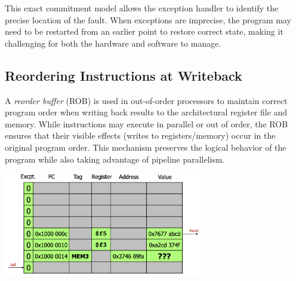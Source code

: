 This exact commitment model allows the exception handler to identify the precise location of the fault. When exceptions are imprecise, the program may need to be restarted from an earlier point to restore correct state, making it challenging for both the hardware and software to manage.

\newpage
\subsection{Reordering Instructions at Writeback}
A \emph{reorder buffer} (ROB) is used in out-of-order processors to maintain correct program order when writing back results to the architectural register file and memory. While instructions may execute in parallel or out of order, the ROB ensures that their visible effects (writes to registers/memory) occur in the original program order. This mechanism preserves the logical behavior of the program while also taking advantage of pipeline parallelism.
\begin{center}
    \includegraphics[width=0.65\textwidth]{chapters/chapter4d/images/rob.png}
\end{center}
